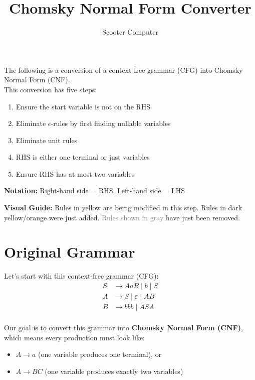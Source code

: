 \documentclass{article}
\begin{document}
\title{\textbf{Chomsky Normal Form Converter}}
\author{Scooter Computer}
\date{}
\maketitle
\thispagestyle{fancy}

The following is a conversion of a context-free grammar (CFG) into Chomsky Normal Form (CNF). \\

This conversion has five steps:
\begin{enumerate}
\item Ensure the start variable is not on the RHS
\item Eliminate $\epsilon$-rules by first finding nullable variables
\item Eliminate unit rules
\item RHS is either one terminal or just variables
\item Ensure RHS has at most two variables
\end{enumerate}
\textbf{Notation:} Right-hand side = RHS, Left-hand side = LHS

\vspace{0.2cm}

\colorbox{yellow!30}{\parbox{\dimexpr\textwidth-2\fboxsep}{\textbf{Visual Guide:} \colorbox{yellow!50}{Rules in yellow} are being modified in this step. \textcolor{orange!80!black}{Rules in dark yellow/orange} were just added. \textcolor{gray}{Rules shown in gray} have just been removed.}}

\vspace{0.5cm}

\section*{Original Grammar}

Let's start with this context-free grammar (CFG):
\begin{align*}
    S &\to AaB  \mid b  \mid S \\
    A &\to S  \mid \varepsilon  \mid AB \\
    B &\to bbb  \mid ASA \\
    \end{align*}

Our goal is to convert this grammar into \textbf{Chomsky Normal Form (CNF)}, which means every production must look like:
\begin{itemize}
    \item $A \to a$ (one variable produces one terminal), or
    \item $A \to BC$ (one variable produces exactly two variables)
\end{itemize}
\end{document}
